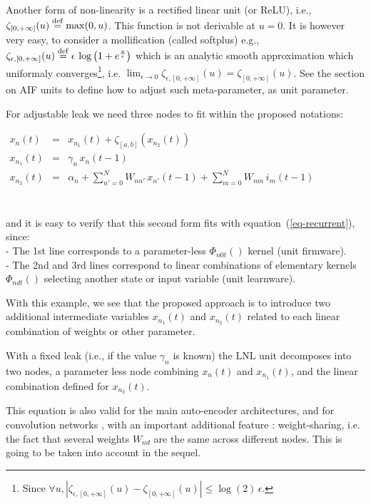 Another form of non-linearity is a rectified linear unit (or ReLU), i.e., $\zeta_{[0,+\infty]}(u) \stackrel {\rm def}{=} \max(0, u)$. This function is not derivable at $u = 0$. It is however very easy, to consider a mollification (called softplus) e.g., $\zeta_{\epsilon, [0,+\infty]}(u) \stackrel {\rm def}{=} \epsilon \, \log\left(1 + e^{\frac{u}{\epsilon}}\right)$ which is an analytic smooth approximation which uniformaly converges\footnote{Since $\forall u, |\zeta_{\epsilon, [0,+\infty]}(u) - \zeta_{[0,+\infty]}(u)| \leq \log(2) \, \epsilon$.}, i.e. $\lim_{\epsilon \rightarrow 0} \zeta_{\epsilon, [0,+\infty]}(u) = \zeta_{[0,+\infty]}(u)$. See the section on AIF units to define how to adjust such meta-parameter, as unit parameter.

For adjustable leak we need three nodes to fit within the proposed notations:
\\\centerline{$\begin{array}{rcl}
 x_n(t) &=& x_{n_1}(t) + \zeta_{[a,b]}\left(x_{n_2}(t)\right) \\
 x_{n_1}(t) &=& \gamma_n \, x_{n}(t-1) \\
 x_{n_2}(t) &=& \alpha_n + \sum_{n' = 0}^{N} W_{nn'} \, x_{n'}(t-1) + \sum_{m = 0}^{N} W_{nm} \, i_m(t-1) \\
\end{array}$}\\
and it is easy to verify that this second form fits with equation~(\ref{eq-recurrent}), since:
\\- The 1st line corresponds to a parameter-less $\Phi_{n0t}\left(\right)$ kernel (unit firmware).
\\- The 2nd and 3rd lines correspond to linear combinations of elementary kernels $\Phi_{ndt}\left(\right)$ selecting another state or input variable (unit learnware).

With this example, we see that the proposed approach is to introduce two additional intermediate variables $x_{n_1}(t)$ and $x_{n_2}(t)$ related to each linear combination of weights or other parameter.

With a fixed leak (i.e., if the value $\gamma_n$ is known) the LNL unit decomposes into two nodes, a parameter less node combining $x_n(t)$ and $x_{n_1}(t)$, and the linear combination defined for $x_{n_2}(t)$.

This equation is also valid for the main auto-encoder architectures, and for convolution networks \cite{Bengio:2009,Deng:2014}, with an important additional feature : weight-sharing, i.e. the fact that several weights $W_{nd}$ are the same across different nodes. This is going to be taken into account in the sequel.


